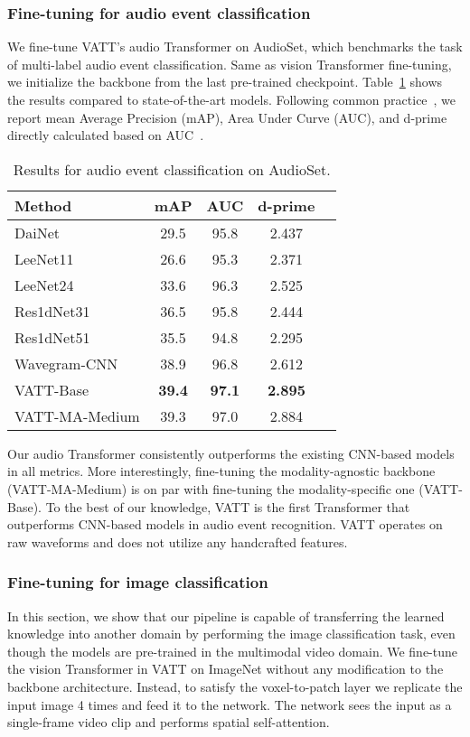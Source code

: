 \documentclass[10pt,twocolumn,letterpaper]{article}
\newcommand{\ours}{VATT\xspace}
\begin{document}
\subsubsection{Fine-tuning for audio event classification}
We fine-tune \ours's audio Transformer on AudioSet, which benchmarks the task of multi-label audio event classification. Same as vision Transformer fine-tuning, we initialize the backbone from the last pre-trained checkpoint. Table~\ref{table:audio-classification} shows the results compared to state-of-the-art models. Following common practice~\cite{gemmeke2017audio,kong2019weakly}, we report mean Average Precision (mAP), Area Under Curve (AUC), and d-prime directly calculated based on AUC~\cite{gemmeke2017audio}.
\begin{table}[h!]
    \small
    \centering
    \begin{tabular}{@{}lcccc@{}}
    \toprule
        \sc Method & mAP & AUC & d-prime \\
    \midrule
    DaiNet~\cite{dai2017very} & 29.5 & 95.8 & 2.437\\
    LeeNet11~\cite{lee2017sample} & 26.6 & 95.3 & 2.371\\
    LeeNet24~\cite{lee2017sample} & 33.6 & 96.3 & 2.525\\
    Res1dNet31~\cite{kong2020panns} & 36.5 & 95.8 & 2.444\\
    Res1dNet51~\cite{kong2020panns} & 35.5 & 94.8 & 2.295\\
    Wavegram-CNN~\cite{kong2020panns} & 38.9 & 96.8 & 2.612\\
    \midrule
    \ours-Base & \textbf{39.4} & \textbf{97.1}  & \textbf{2.895}\\
    \midrule
    \ours-MA-Medium & 39.3 & 97.0  & 2.884\\
    \bottomrule
    \end{tabular}
    \vspace{2mm}
    \caption{Results for audio event classification on AudioSet.}
    \label{table:audio-classification}
\end{table} 
Our audio Transformer consistently outperforms the existing CNN-based models in all metrics. More interestingly, fine-tuning the modality-agnostic backbone (VATT-MA-Medium) is on par with fine-tuning the modality-specific one (VATT-Base). To the best of our knowledge, \ours is the first Transformer that outperforms CNN-based models in audio event recognition. \ours operates on raw waveforms and does not utilize any handcrafted features.

\subsubsection{Fine-tuning for image classification}
In this section, we show that our pipeline is capable of transferring the learned knowledge into another domain by performing the image classification task, even though the models are pre-trained in the multimodal video domain.
We fine-tune the vision Transformer in \ours on ImageNet without any modification to the backbone architecture. Instead, to satisfy the voxel-to-patch layer we replicate the input image 4 times and feed it to the network. The network sees the input as a single-frame video clip and performs spatial self-attention.
\end{document}
